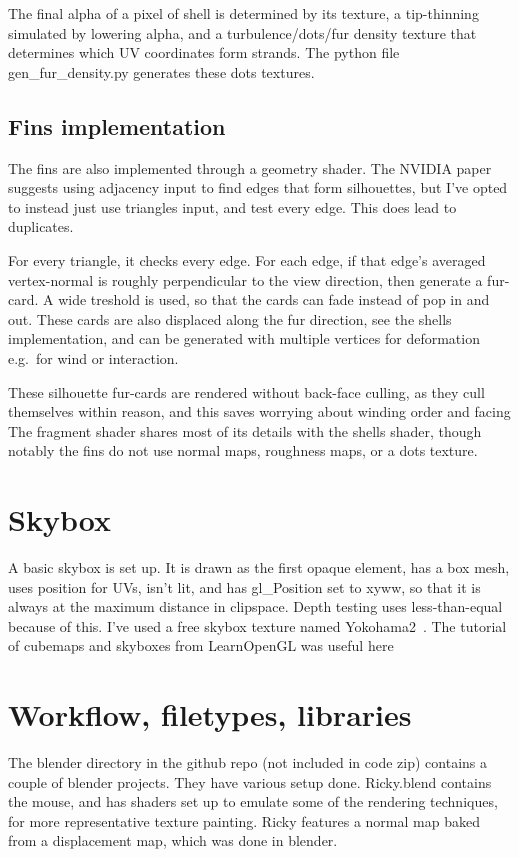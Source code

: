 \documentclass[a4paper, 12pt]{article}
\begin{document}
    The final alpha of a pixel of shell is determined by
    its texture, a tip-thinning simulated by lowering alpha,
    and a turbulence/dots/fur density texture that determines which UV coordinates form strands.
    The python file gen\_fur\_density.py generates these dots textures.

    \subsection{Fins implementation}

    The fins are also implemented through a geometry shader.
    The NVIDIA paper suggests using adjacency input to find edges that form silhouettes,
    but I've opted to instead just use triangles input,
    and test every edge.
    This does lead to duplicates.

    For every triangle, it checks every edge.
    For each edge, if that edge's averaged vertex-normal
    is roughly perpendicular to the view direction,
    then generate a fur-card.
    A wide treshold is used, so that the cards can fade instead of pop in and out.
    These cards are also displaced along the fur direction, see the shells implementation,
    and can be generated with multiple vertices for deformation e.g.\ for wind or interaction.

    These silhouette fur-cards are rendered without back-face culling,
    as they cull themselves within reason,
    and this saves worrying about winding order and facing
    The fragment shader shares most of its details with the shells shader,
    though notably the fins do not use normal maps, roughness maps, or a dots texture.

    \section{Skybox}
    A basic skybox is set up.
    It is drawn as the first opaque element,
    has a box mesh,
    uses position for UVs,
    isn't lit,
    and has gl\_Position set to xyww,
    so that it is always at the maximum distance in clipspace.
    Depth testing uses less-than-equal because of this.
    I've used a free skybox texture named Yokohama2~\cite{yokohama2}.
    The tutorial of cubemaps and skyboxes from LearnOpenGL was useful here~\cite{learncubemaps}

    \section{Workflow, filetypes, libraries}
    The blender directory in the github repo (not included in code zip) contains a couple of blender projects.
    They have various setup done.
    Ricky.blend contains the mouse,
    and has shaders set up to emulate some of the rendering techniques,
    for more representative texture painting.
    Ricky features a normal map baked from a displacement map, which was done in blender.
\end{document}
